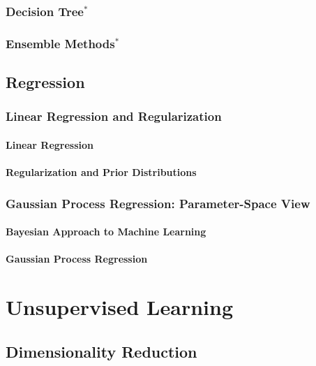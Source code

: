 \documentclass{report}
\begin{document}
\subsection{Decision Tree$^*$}

\subsection{Ensemble Methods$^*$}


\section{Regression}
\label{sec:regression}

\subsection{Linear Regression and Regularization}

\subsubsection{Linear Regression}

\subsubsection{Regularization and Prior Distributions}

\subsection{Gaussian Process Regression: Parameter-Space View}

\subsubsection{Bayesian Approach to Machine Learning}

\subsubsection{Gaussian Process Regression}


\chapter{Unsupervised Learning}
\label{chap:unsupervised}

\section{Dimensionality Reduction}
\label{sec:dimred}
\end{document}
